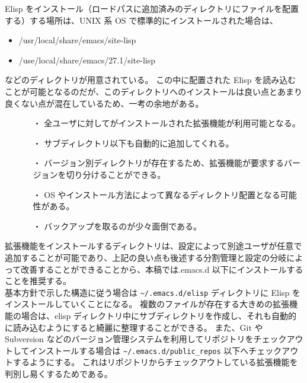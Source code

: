 Elisp をインストール（ロードパスに追加済みのディレクトリにファイルを配置する）する場所は、UNIX 系 OS で標準的にインストールされた場合は、
\begin{itemize}\setlength{\leftskip}{-1.00zw}%
\item /usr/local/share/emacs/site-lisp
\item /use/local/share/emacs/27.1/site-lisp
\end{itemize}
などのディレクトリが用意されている。
この中に配置された Elisp を読み込むことが可能となるのだが、このディレクトリへのインストールは良い点とあまり良くない点が混在しているため、一考の余地がある。
\begin{itemize}\setlength{\leftskip}{-1.00zw}%
\item[] 
  \begin{itemize}\setlength{\leftskip}{-1.00zw}%
  \item[・] 全ユーザに対してがインストールされた拡張機能が利用可能となる。
  \item[・] サブディレクトリ以下も自動的に追加してくれる。
  \item[・] バージョン別ディレクトリが存在するため、拡張機能が要求するバージョンを切り分けることができる。
  \end{itemize}
\item[] 
  \begin{itemize}\setlength{\leftskip}{-1.00zw}%
  \item[・] OS やインストール方法によって異なるディレクトリ配置となる可能性がある。
  \item[・] バックアップを取るのが少々面倒である。
  \end{itemize}
\end{itemize}
拡張機能をインストールするディレクトリは、設定によって別途ユーザが任意で追加することが可能であり、上記の良い点も後述する分割管理と設定の分岐によって改善することができることから、本稿では.emacs.d 以下にインストールすることを推奨する。\\

基本方針で示した構造に従う場合は \texttt{\textasciitilde{}/.emacs.d/elisp} ディレクトリに Elisp をインストールしていくことになる。
複数のファイルが存在する大きめの拡張機能の場合は、elisp ディレクトリ中にサブディレクトリを作成し、それも自動的に読み込むようにすると綺麗に整理することができる。
また、Git や Subversion などのバージョン管理システムを利用してリポジトリをチェックアウトしてインストールする場合は \texttt{\textasciitilde{}/.emacs.d/public\_repos} 以下へチェックアウトするようにする。
これはリポジトリからチェックアウトしている拡張機能を判別し易くするためである。
